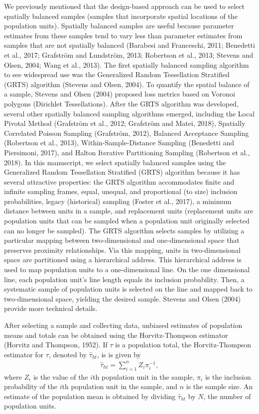 \documentclass[]{elsarticle} %
\begin{document}
We previously mentioned that the design-based approach can be used to
select spatially balanced samples (samples that incorporate spatial
locations of the population units). Spatially balanced samples are
useful because parameter estimates from these samples tend to vary less
than parameter estimates from samples that are not spatially balanced
(Barabesi and Franceschi, 2011; Benedetti et al., 2017; Grafström and
Lundström, 2013; Robertson et al., 2013; Stevens and Olsen, 2004; Wang
et al., 2013). The first spatially balanced sampling algorithm to see
widespread use was the Generalized Random Tessellation Stratified (GRTS)
algorithm (Stevens and Olsen, 2004). To quantify the spatial balance of
a sample, Stevens and Olsen (2004) proposed loss metrics based on
Voronoi polygons (Dirichlet Tessellations). After the GRTS algorithm was
developed, several other spatially balanced sampling algorithms emerged,
including the Local Pivotal Method (Grafström et al., 2012; Grafström
and Matei, 2018), Spatially Correlated Poisson Sampling (Grafström,
2012), Balanced Acceptance Sampling (Robertson et al., 2013),
Within-Sample-Distance Sampling (Benedetti and Piersimoni, 2017), and
Halton Iterative Partitioning Sampling (Robertson et al., 2018). In this
manuscript, we select spatially balanced samples using the Generalized
Random Tessellation Stratified (GRTS) algorithm because it has several
attractive properties: the GRTS algorithm accommodates finite and
infinite sampling frames, equal, unequal, and proportional (to size)
inclusion probabilities, legacy (historical) sampling (Foster et al.,
2017), a minimum distance between units in a sample, and replacement
units (replacement units are population units that can be sampled when a
population unit originally selected can no longer be sampled). The GRTS
algorithm selects samples by utilizing a particular mapping between
two-dimensional and one-dimensional space that preserves proximity
relationships. Via this mapping, units in two-dimensional space are
partitioned using a hierarchical address. This hierarchical address is
used to map population units to a one-dimensional line. On the one
dimensional line, each population unit's line length equals its
inclusion probability. Then, a systematic sample of population units is
selected on the line and mapped back to two-dimensional space, yielding
the desired sample. Stevens and Olsen (2004) provide more technical
details.

After selecting a sample and collecting data, unbiased estimates of
population means and totals can be obtained using the Horvitz-Thompson
estimator (Horvitz and Thompson, 1952). If \(\tau\) is a population
total, the Horvitz-Thompson estimator for \(\tau\), denoted by
\(\hat{\tau}_{ht}\), is is given by \begin{align}\label{eq:ht}
  \hat{\tau}_{ht} = \sum_{i = 1}^n Z_i \pi_i^{-1},
\end{align} where \(Z_i\) is the value of the \(i\)th population unit in
the sample, \(\pi_i\) is the inclusion probability of the \(i\)th
population unit in the sample, and \(n\) is the sample size. An estimate
of the population mean is obtained by dividing \(\hat{\tau}_{ht}\) by
\(N\), the number of population units.
\end{document}
